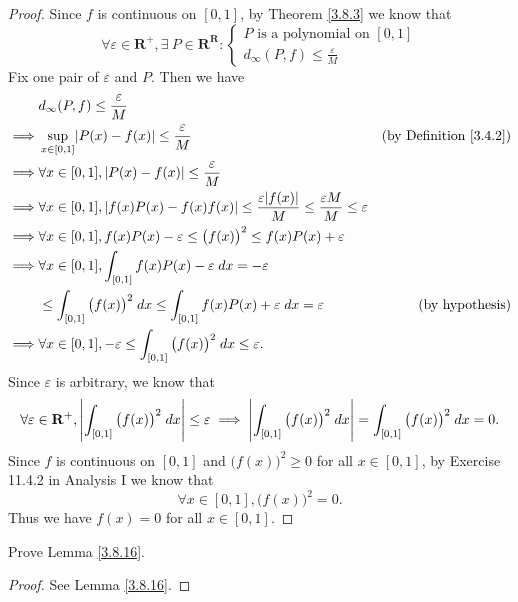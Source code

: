\begin{proof}
    Since \(f\) is continuous on \([0, 1]\), by Theorem \ref{3.8.3} we know that
    \[
        \forall \varepsilon \in \mathbf{R}^+, \exists\ P \in \mathbf{R}^{\mathbf{R}} : \begin{cases}
            P \text{ is a polynomial on } [0, 1] \\
            d_{\infty}(P, f) \leq \frac{\varepsilon}{M}
        \end{cases}
    \]
    Fix one pair of \(\varepsilon\) and \(P\).
    Then we have
    \begin{align*}
                 & d_\infty(P, f) \leq \frac{\varepsilon}{M}                                                                                                                                    \\
        \implies & \sup_{x \in [0, 1]} \abs*{P(x) - f(x)} \leq \frac{\varepsilon}{M}                                                                       & \text{(by Definition \ref{3.4.2})} \\
        \implies & \forall x \in [0, 1], \abs*{P(x) - f(x)} \leq \frac{\varepsilon}{M}                                                                                                          \\
        \implies & \forall x \in [0, 1], \abs*{f(x) P(x) - f(x) f(x)} \leq \frac{\varepsilon \abs*{f(x)}}{M} \leq \frac{\varepsilon M}{M} \leq \varepsilon                                      \\
        \implies & \forall x \in [0, 1], f(x) P(x) - \varepsilon \leq \big(f(x)\big)^2 \leq f(x) P(x) + \varepsilon                                                                             \\
        \implies & \forall x \in [0, 1], \int_{[0, 1]} f(x) P(x) - \varepsilon \; dx = -\varepsilon                                                                                             \\
                 & \leq \int_{[0, 1]} \big(f(x)\big)^2 \; dx \leq \int_{[0, 1]} f(x) P(x) + \varepsilon \; dx = \varepsilon                                & \text{(by hypothesis)}             \\
        \implies & \forall x \in [0, 1], -\varepsilon \leq \int_{[0, 1]} \big(f(x)\big)^2 \; dx \leq \varepsilon.
    \end{align*}
    Since \(\varepsilon\) is arbitrary, we know that
    \[
        \forall \varepsilon \in \mathbf{R}^+, \abs*{\int_{[0, 1]} \big(f(x)\big)^2 \; dx} \leq \varepsilon \implies \abs*{\int_{[0, 1]} \big(f(x)\big)^2 \; dx} = \int_{[0, 1]} \big(f(x)\big)^2 \; dx = 0.
    \]
    Since \(f\) is continuous on \([0, 1]\) and \(\big(f(x)\big)^2 \geq 0\) for all \(x \in [0, 1]\), by Exercise 11.4.2 in Analysis I we know that
    \[
        \forall x \in [0, 1], \big(f(x)\big)^2 = 0.
    \]
    Thus we have \(f(x) = 0\) for all \(x \in [0, 1]\).
\end{proof}

\begin{exercise}\label{ex 3.8.9}
    Prove Lemma \ref{3.8.16}.
\end{exercise}

\begin{proof}
    See Lemma \ref{3.8.16}.
\end{proof}
